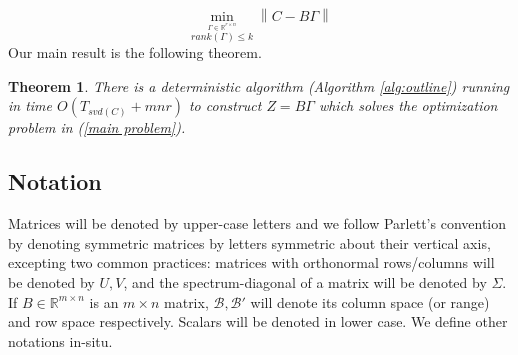 \documentclass[11pt]{article}
\newtheorem{theorem}{Theorem}
\renewcommand{\math}[1]{$#1$}
\def\reals{\mathbb{R}}
\newcommand{\norm}[1]{\left\|#1\right\|}
\newcommand{\B}{\mathcal{B}}
\newcommand{\G}{\Gamma}
\newcommand{\0}{\ensuremath{\mathbf{0}}}
\renewcommand{\>}{\succ}
\newcommand{\<}{\prec}
\begin{document}
\begin{equation}\label{main problem}
\min_{\stackrel{\G \in  \reals^{r \times n}}{rank({\G}) \leq k}} \norm{{C} - {B\G}}
\end{equation}
Our main result is the following theorem.
\begin{theorem}\label{thm:main}
There is a deterministic algorithm (Algorithm \ref{alg:outline})
 running in time
\math{O(T_{svd(C)}+mnr)} to construct \math{Z=B \G} which solves the optimization
problem in (\ref{main problem}).
\end{theorem}
\subsection{Notation}
Matrices will be denoted by upper-case letters and we follow Parlett's convention by denoting symmetric matrices by letters symmetric about their vertical axis, excepting two common practices: matrices with orthonormal rows/columns will be denoted by $U, V$, and the spectrum-diagonal of a matrix will be denoted by $\Sigma$. If $B \in \reals^{m \times n}$ is an $m \times n$ matrix, $\B, \B'$ will denote its column space (or range) and row space respectively. Scalars will be denoted in lower case. We define other notations in-situ. 
\end{document}
